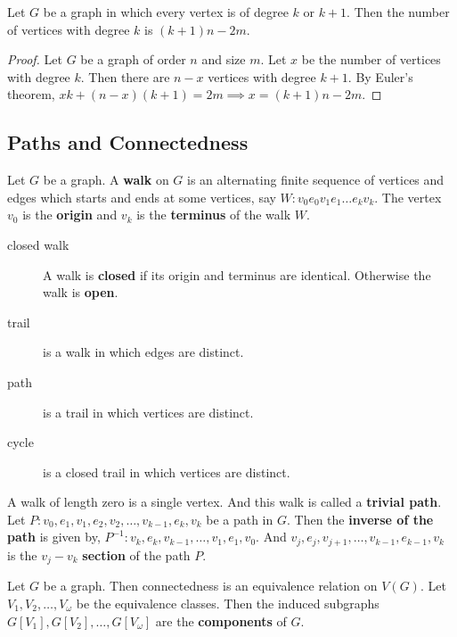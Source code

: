 \begin{exercise}
	Let $G$ be a graph in which every vertex is of degree $k$ or $k+1$. Then the number of vertices with degree $k$ is $(k+1)n-2m$.
\end{exercise}
\begin{proof}
	Let $G$ be a graph of order $n$ and size $m$.
	Let $x$ be the number of vertices with degree $k$.
	Then there are $n-x$ vertices with degree $k+1$.
	By Euler's theorem, $ xk + (n-x)(k+1) = 2m \implies x = (k+1)n-2m$.
\end{proof}
	
\subsection{Paths and Connectedness}
\begin{definition}
	Let $G$ be a graph. A \textbf{walk} on $G$ is an alternating finite sequence of vertices and edges which starts and ends at some vertices, say $W : v_0 e_0 v_1 e_1 \dots e_k v_k$.
	The vertex $v_0$ is the \textbf{origin} and $v_k$ is the \textbf{terminus} of the walk $W$.
\end{definition}
\begin{description}
	\item[closed walk] A walk is \textbf{closed} if its origin and terminus are identical. Otherwise the walk is \textbf{open}.
	\item[trail] is a walk in which edges are distinct.
	\item[path] is a trail in which vertices are distinct.
	\item[cycle] is a closed trail in which vertices are distinct.
\end{description}

\begin{remark}
	A walk of length zero is a single vertex. And this walk is called a \textbf{trivial path}.
	Let $P : v_0,e_1,v_1,e_2,v_2,\dots,v_{k-1},e_k,v_k$ be a path in $G$. Then the \textbf{inverse of the path} is given by, $P^{-1} : v_k,e_k,v_{k-1},\dots,v_1,e_1,v_0$.
	And $v_j,e_j,v_{j+1},\dots,v_{k-1},e_{k-1},v_k$ is the $v_j-v_k$ \textbf{section} of the path $P$.
\end{remark}

\begin{definition}
	Let $G$ be a graph. Then connectedness is an equivalence relation on $V(G)$. Let $V_1,V_2,\dots,V_\omega$ be the equivalence classes. Then the induced subgraphs $G[V_1], G[V_2], \dots, G[V_\omega]$ are the \textbf{components} of $G$.
\end{definition}

